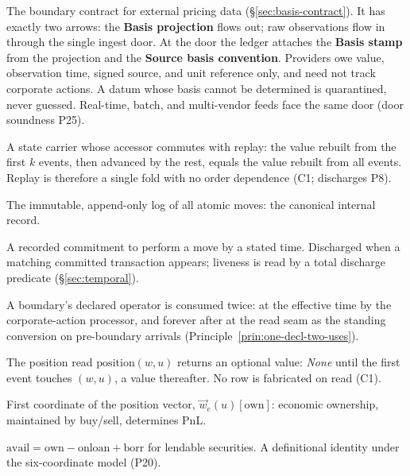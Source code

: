 \begin{description}[style=nextline]
\item[Market-data contract] The boundary contract for external pricing data (\S\ref{sec:basis-contract}). It has exactly two arrows: the \textbf{Basis projection} flows out; raw observations flow in through the single ingest door. At the door the ledger attaches the \textbf{Basis stamp} from the projection and the \textbf{Source basis convention}. Providers owe value, observation time, signed source, and unit reference only, and need not track corporate actions. A datum whose basis cannot be determined is quarantined, never guessed. Real-time, batch, and multi-vendor feeds face the same door (door soundness P25).

\item[Monotone carrier] A state carrier whose accessor commutes with replay: the value rebuilt from the first $k$ events, then advanced by the rest, equals the value rebuilt from all events. Replay is therefore a single fold with no order dependence (C1; discharges P8).

\item[Move stream] The immutable, append-only log of all atomic moves: the canonical internal record.

\item[Obligation] A recorded commitment to perform a move by a stated time. Discharged when a matching committed transaction appears; liveness is read by a total discharge predicate (\S\ref{sec:temporal}).

\item[One declaration, two consumers] A boundary's declared operator is consumed twice: at the effective time by the corporate-action processor, and forever after at the read seam as the standing conversion on pre-boundary arrivals (Principle~\ref{prin:one-decl-two-uses}).

\item[Option accessor] The position read $\mathrm{position}(w,u)$ returns an optional value: \emph{None} until the first event touches $(w,u)$, a value thereafter. No row is fabricated on read (C1).

\item[Own] First coordinate of the position vector, $\vec{w}_e(u)[\mathrm{own}]$: economic ownership, maintained by buy/sell, determines PnL.

\item[Ownership consistency] $\mathrm{avail}=\mathrm{own}-\mathrm{onloan}+\mathrm{borr}$ for lendable securities. A definitional identity under the six-coordinate model (P20).


\end{description}
